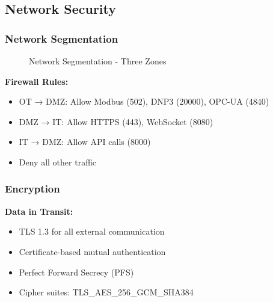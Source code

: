 \documentclass[12pt,a4paper]{article}
\begin{document}
\subsection{Network Security}

\subsubsection{Network Segmentation}

\begin{figure}[H]
\centering
{}
\caption{Network Segmentation - Three Zones}
\end{figure}

\textbf{Firewall Rules:}
\begin{itemize}[leftmargin=1cm,itemsep=0pt]
    \item OT → DMZ: Allow Modbus (502), DNP3 (20000), OPC-UA (4840)
    \item DMZ → IT: Allow HTTPS (443), WebSocket (8080)
    \item IT → DMZ: Allow API calls (8000)
    \item Deny all other traffic
\end{itemize}

\subsubsection{Encryption}

\textbf{Data in Transit:}
\begin{itemize}[leftmargin=1cm,itemsep=0pt]
    \item TLS 1.3 for all external communication
    \item Certificate-based mutual authentication
    \item Perfect Forward Secrecy (PFS)
    \item Cipher suites: TLS\_AES\_256\_GCM\_SHA384
\end{itemize}
\end{document}
